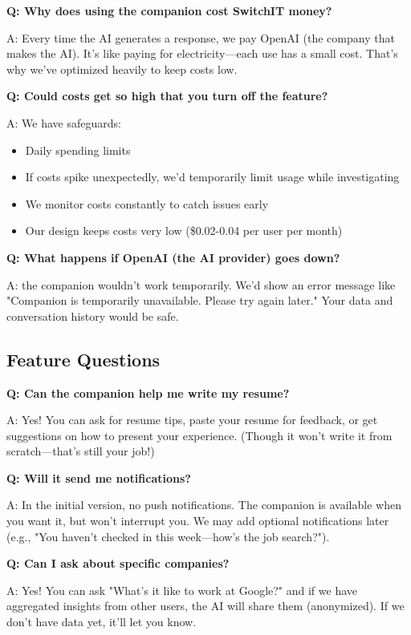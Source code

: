 \documentclass[12pt,a4paper]{article}
\begin{document}
\textbf{Q: Why does using the companion cost SwitchIT money?}

A: Every time the AI generates a response, we pay OpenAI (the company that makes the AI). It's like paying for electricity—each use has a small cost. That's why we've optimized heavily to keep costs low.

\textbf{Q: Could costs get so high that you turn off the feature?}

A: We have safeguards:
\begin{itemize}
  \item Daily spending limits
  \item If costs spike unexpectedly, we'd temporarily limit usage while investigating
  \item We monitor costs constantly to catch issues early
  \item Our design keeps costs very low (\$0.02-0.04 per user per month)
\end{itemize}

\textbf{Q: What happens if OpenAI (the AI provider) goes down?}

A: the companion wouldn't work temporarily. We'd show an error message like "Companion is temporarily unavailable. Please try again later." Your data and conversation history would be safe.

\subsection{Feature Questions}

\textbf{Q: Can the companion help me write my resume?}

A: Yes! You can ask for resume tips, paste your resume for feedback, or get suggestions on how to present your experience. (Though it won't write it from scratch—that's still your job!)

\textbf{Q: Will it send me notifications?}

A: In the initial version, no push notifications. The companion is available when you want it, but won't interrupt you. We may add optional notifications later (e.g., "You haven't checked in this week—how's the job search?").

\textbf{Q: Can I ask about specific companies?}

A: Yes! You can ask "What's it like to work at Google?" and if we have aggregated insights from other users, the AI will share them (anonymized). If we don't have data yet, it'll let you know.
\end{document}
